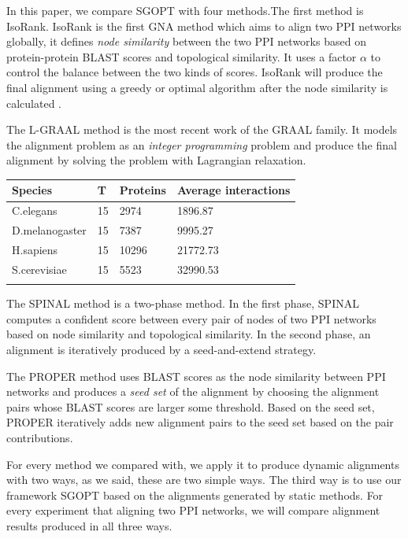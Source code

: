 \documentclass{bioinfo}
\theoremstyle{definition}
\begin{document}
In this paper, we compare SGOPT with four methods.The first method is IsoRank\citep{singh2008global}. IsoRank is the first GNA method which aims to align two PPI networks globally, it defines \textit{node similarity} between the two PPI networks based on protein-protein BLAST scores\citep{altschul1990basic} and topological similarity. It uses a factor $\alpha$ to control the balance between the two kinds of scores. IsoRank will produce the final alignment using a greedy or optimal algorithm after the node similarity is calculated .

The L-GRAAL\citep{malod2015graal} method is the most recent work of the GRAAL family. It models the alignment problem as an \textit{integer programming} problem and produce the final alignment by solving the problem with Lagrangian relaxation.

\begin{table}[!h]
{
\begin{tabular}{@{}llll@{}}
\toprule 
Species & T & Proteins & Average interactions\\
\midrule
C.elegans & 15 & 2974 & 1896.87\\
D.melanogaster & 15 & 7387 & 9995.27\\
H.sapiens & 15 & 10296 & 21772.73\\
S.cerevisiae & 15 & 5523 & 32990.53\\
\botrule
\end{tabular}
}{}
\end{table}

The SPINAL\citep{aladaug2013spinal} method is a two-phase method. In the first phase, SPINAL computes a confident score between every pair of nodes of two PPI networks based on node similarity and topological similarity. In the second phase, an alignment is iteratively produced by a seed-and-extend strategy.

The PROPER\citep{kazemi2016proper} method uses BLAST scores as the node similarity between PPI networks and produces a \textit{seed set} of the alignment by choosing the alignment pairs whose BLAST scores are larger some threshold. Based on the seed set, PROPER iteratively adds new alignment pairs to the seed set based on the pair contributions.

For every method we compared with, we apply it to produce dynamic alignments with two ways, as we said, these are two simple ways. The third way is to use our framework SGOPT based on the alignments generated by static methods. For every experiment that aligning two PPI networks, we will compare alignment results produced in all three ways.
\end{document}
